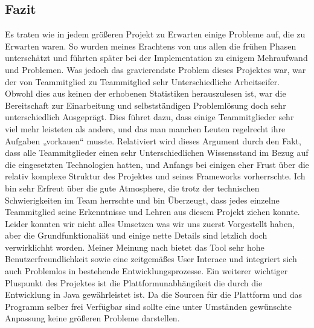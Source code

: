 \subsection{Fazit}

Es traten wie in jedem größeren Projekt zu Erwarten einige Probleme auf, die zu Erwarten waren. So wurden meines Erachtens von uns allen die frühen Phasen unterschätzt und führten später bei der Implementation zu einigem Mehraufwand und Problemen. Was jedoch das gravierendste Problem dieses Projektes war, war der von Teammitglied zu Teammitglied sehr Unterschiedliche Arbeitseifer. Obwohl dies aus keinen der erhobenen Statistiken herauszulesen ist, war die Bereitschaft zur Einarbeitung und selbstständigen Problemlösung doch sehr unterschiedlich Ausgeprägt. Dies führet dazu, dass einige Teammitglieder sehr viel mehr leisteten als andere, und das man manchen Leuten regelrecht ihre Aufgaben „vorkauen“ musste. Relativiert wird dieses Argument durch den Fakt, dass alle Teammitglieder einen sehr Unterschiedlichen Wissensstand im Bezug auf die eingesetzten Technologien hatten, und Anfangs bei einigen eher Frust über die relativ komplexe Struktur des Projektes und seines Frameworks vorherrschte. 
Ich bin sehr Erfreut über die gute Atmosphere, die trotz der technischen Schwierigkeiten im Team herrschte und bin Überzeugt, dass jedes einzelne Teammitglied seine Erkenntnisse und Lehren aus diesem Projekt ziehen konnte. Leider konnten wir  nicht alles Umsetzen was wir uns zuerst Vorgestellt haben, aber die Grundfunktionaliät und einige nette Details sind letzlich doch verwirklichht worden. Meiner Meinung nach bietet das Tool sehr hohe Benutzerfreundlichkeit sowie eine zeitgemäßes User Interace und integriert sich auch Problemlos in bestehende Entwicklungsprozesse. Ein weiterer wichtiger Pluspunkt des Projektes ist die Plattformunabhängikeit die durch die Entwicklung in Java gewährleistet ist. Da die Sourcen für die Plattform und das Programm selber frei Verfügbar sind sollte eine unter Umständen gewünschte Anpassung keine größeren Probleme darstellen.